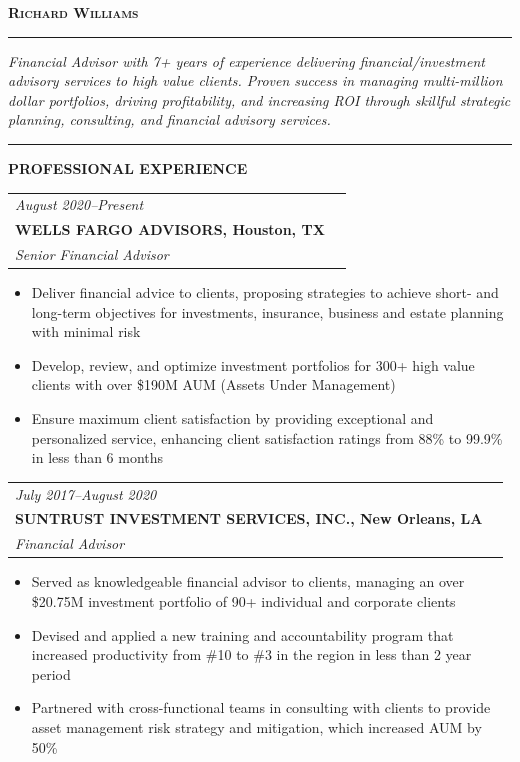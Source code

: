 \documentclass[11pt]{article}
\makeatletter
\newcommand{\resumeItem}[1]{
  \item \small{#1}\vspace{-2pt}
}
\newcommand{\resumeSection}[1]{
  \vspace{2mm}
  \par\noindent\textcolor{black}{\rule{2pt}{0.35cm}}
  \hspace{1mm}\textbf{\large #1}\par
  \vspace{1mm}
}
\newenvironment{resumeSubsection}
  {\begin{tabular*}{\textwidth}{@{\hspace{-0.5em}\extracolsep{\fill}}ll}}
  {\end{tabular*}}
\makeatother
\begin{document}
\begin{center}
    \textbf{\Huge \scshape Richard Williams}
\end{center}

\vspace{-1em}
\noindent\rule{\textwidth}{2pt}
\vspace{2mm}

\vspace{-1em}
\noindent\textit{Financial Advisor with 7+ years of experience delivering financial/investment advisory services to high value clients. Proven success in managing multi-million dollar portfolios, driving profitability, and increasing ROI through skillful strategic planning, consulting, and financial advisory services.}

\vspace{1em}

\resumeSection{PROFESSIONAL EXPERIENCE}

\vspace{1em}
\begin{resumeSubsection}
  \vspace{0.5em}
  \textit {August 2020--Present} \\
  \textbf{WELLS FARGO ADVISORS, Houston, TX} \\
  \textit{Senior Financial Advisor}
\end{resumeSubsection}
\begin{itemize}
  \setlength{\leftmargin}{0.5em}
  \resumeItem{Deliver financial advice to clients, proposing strategies to achieve short- and long-term objectives for investments, insurance, business and estate planning with minimal risk}
  \resumeItem{Develop, review, and optimize investment portfolios for 300+ high value clients with over \$190M AUM (Assets Under Management)}
  \resumeItem{Ensure maximum client satisfaction by providing exceptional and personalized service, enhancing client satisfaction ratings from 88\% to 99.9\% in less than 6 months}
\end{itemize}

\vspace{1em}
\begin{resumeSubsection}
  \vspace{0.5em}
  \textit {July 2017--August 2020} \\
  \textbf{SUNTRUST INVESTMENT SERVICES, INC., New Orleans, LA} \\
  \textit{Financial Advisor}
\end{resumeSubsection}
\begin{itemize}
  \setlength{\leftmargin}{0.5em}
  \resumeItem{Served as knowledgeable financial advisor to clients, managing an over \$20.75M investment portfolio of 90+ individual and corporate clients}
  \resumeItem{Devised and applied a new training and accountability program that increased productivity from \#10 to \#3 in the region in less than 2 year period}
  \resumeItem{Partnered with cross-functional teams in consulting with clients to provide asset management risk strategy and mitigation, which increased AUM by 50\%}
\end{itemize}
\end{document}
